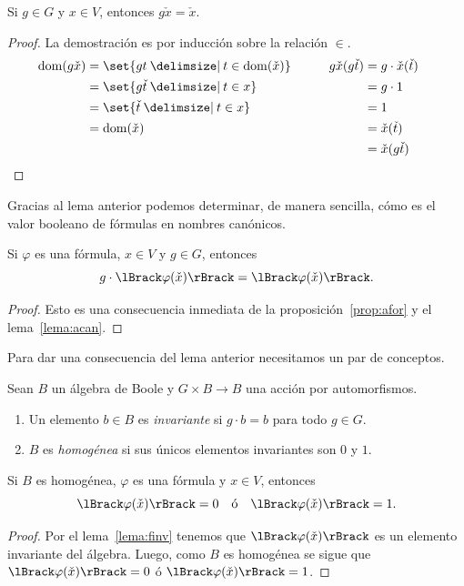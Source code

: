 \documentclass[letterpaper,DIV=15,12pt]{scrartcl}
\DeclarePairedDelimiter{\vb}{\lBrack}{\rBrack}             %
\DeclareMathOperator{\dom}{dom}                            %
\newcommand{\st}{}
\newcommand{\SetSymbol}[1][]{%
\nonscript\:#1\vert
\allowbreak
\nonscript\:
\mathopen{}}
\renewcommand\st{\SetSymbol[\delimsize]}
\begin{document}
\begin{lemma}[label=lema:acan]
    Si \(g\in G\) y \(x\in V\), entonces \(g\check{x}=\check{x}\).
\end{lemma}
\begin{proof}
    La demostración es por inducción sobre la relación \(\in\).
    \begin{alignat*}{2}
        \dom(g\check{x})&=\set{gt\st t\in \dom(\check{x})} &\qquad
        g\check{x}(g\check{t})&=g\cdot\check{x}(\check{t})\\
        &=\set{g\check{t}\st t\in x} & &=g\cdot 1\\
        &=\set{\check{t}\st t\in x} & &=1\\
        &=\dom(\check{x}) & &=\check{x}(\check{t})\\
        & & &=\check{x}(g\check{t})
        \tag*{\qedhere}
    \end{alignat*}
\end{proof}

Gracias al lema anterior podemos determinar, de manera sencilla, cómo es el
valor booleano de fórmulas en nombres canónicos.

\begin{lemma}[label=lema:finv]
    Si \(\varphi\) es una fórmula, \(x\in V\) y \(g\in G\), entonces
    \begin{equation*}
        g\cdot\vb{\varphi(\check{x})}=\vb{\varphi(\check{x})}.
    \end{equation*}
\end{lemma}
\begin{proof}
    Esto es una consecuencia inmediata de la proposición~\ref{prop:afor} y el
    lema~\ref{lema:acan}.
\end{proof}

Para dar una consecuencia del lema anterior necesitamos un par de conceptos.

\begin{definition}
    Sean \(B\) un álgebra de Boole y \(G\times B\to B\) una acción por
    automorfismos.
    \begin{enumerate}
        \item Un elemento \(b\in B\) es \emph{invariante} si \(g\cdot b=b\) para
        todo \(g\in G\).
        \item \(B\) es \emph{homogénea} si sus únicos elementos invariantes son
        \(0\) y \(1\).
    \end{enumerate}
\end{definition}

\begin{corollary}
    Si \(B\) es homogénea, \(\varphi\) es una fórmula y \(x\in V\), entonces
    \begin{equation*}
        \vb{\varphi(\check{x})}=0 \quad\text{ó}\quad
        \vb{\varphi(\check{x})}=1.
    \end{equation*}
\end{corollary}
\begin{proof}
    Por el lema~\ref{lema:finv} tenemos que \(\vb{\varphi(\check{x})}\) es un
    elemento invariante del álgebra. Luego, como \(B\) es homogénea se sigue que
    \(\vb{\varphi(\check{x})}=0\) ó \(\vb{\varphi(\check{x})}=1\).
\end{proof}
\end{document}
